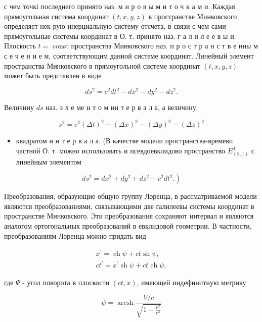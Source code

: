 \documentclass[10pt]{article}
\begin{document}
с чем точкі последнего принято наз. м и р о в ы м и т о ч к а м и. Каждая прямоугольная система координат $(t, x, y, z)$ в пространстве Минковского определяет нек-рую инерциальную систему отсчета, в связи с чем сами прямоугольные системы координат в О. т. принято наз. г а л и л е е в ы и. Плоскость $t=$ const пространства Минковского наз. п р о с т р а н с т в е нны м с е ч е н и е м, соответствующим данной системе координат. Линейный элемент пространства Минковского в прямоугольной системе координат $(t, x, y, z)$ может быть представлен в виде

\[
d s^{2}=c^{2} d t^{2}-d x^{2}-d y^{2}-d z^{2} .
\]

Величину $d s$ наз. э л е ме н т о м ин т е р в а л а, а величину

\[
s^{2}=c^{2}(\Delta t)^{2}-(\Delta x)^{2}-(\Delta y)^{2}-(\Delta z)^{2}
\]

\begin{itemize}
  \item квадратом и н т е р в а л а. (В качестве модели пространства-времеви частной О. т. можно использовать и псевдоевклидово пространство $E_{(3,1)}^{4}$ с линейным элементом
\end{itemize}

\[
\left.d s^{2}=d x^{2}+d y^{2}+d z^{2}-c^{2} d t^{2} .\right)
\]

Преобразования, образующие общую группу Лоренца, в рассматриваемой модели являются преобразованиями, связывающими две галилеевы системы координат в пространстве Минковского. Эти преобразования сохраняют интервал и являются аналогом ортогональных преобразований в евклидовой гөометрии. В частности, преобразованиям Лоренца можно придать вид

\[
\begin{gathered}
x^{\prime}=\operatorname{ch} \psi+c t \operatorname{sh} \psi, \\
c t^{\prime}=x^{\prime} \operatorname{sh} \psi+c t \operatorname{ch} \psi,
\end{gathered}
\]

где $\Psi$ - угол поворота в плоскости $(c t, x)$, имеющей индефинитную метрику

\[
\psi=\operatorname{arcsh} \frac{V / c}{\sqrt{1-\frac{v^{2}}{c^{2}}}}
\]
\end{document}
